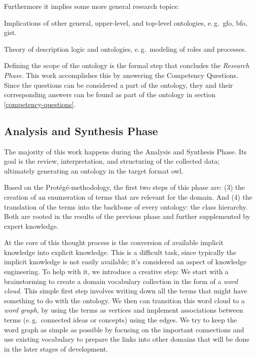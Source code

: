 \documentclass[a4paper, DIV=13, BCOR=0cm]{scrbook}
\newcommand{\eg}{e.\,g.\ }
\begin{document}
Furthermore it implies some more general research topics:
\begin{compactitem}
	\item Implications of other general, upper-level, and top-level ontologies, \eg \gls{gfo}, \gls{bfo}, \gls{gist}.
	\item Theory of description logic and ontologies, \eg modeling of roles and processes.
\end{compactitem}

Defining the scope of the ontology is the formal step that concludes the \textit{Research Phase}. This work accomplishes this by answering the Competency Questions. Since the questions can be considered a part of the ontology, they and their corresponding answers can be found as part of the ontology in section \ref{competency-questions}.

\subsection{Analysis and Synthesis Phase}
\label{analysis}
The majority of this work happens during the Analysis and Synthesis Phase. Its goal is the review, interpretation, and structuring of the collected data; ultimately generating an ontology in the target format \gls{owl}.

Based on the Protégé-methodology, the first two steps of this phase are: (3) the creation of an enumeration of terms that are relevant for the domain. And (4) the translation of the terms into the backbone of every ontology: the class hierarchy. Both are rooted in the results of the previous phase and further supplemented by expert knowledge.

At the core of this thought process is the conversion of available implicit knowledge into explicit knowledge. This is a difficult task, since typically the implicit knowledge is not easily available; it's considered an aspect of knowledge engineering. \cite[p.\,30--31]{moore2011towards} To help with it, we introduce a creative step: We start with a brainstorming to create a domain vocabulary collection in the form of a \textit{word cloud}. This simple first step involves writing down all the terms that might have something to do with the ontology. We then can transition this word cloud to a \textit{word graph}, by using the terms as vertices and implement associations between terms (\eg connected ideas or concepts) using the edges. We try to keep the word graph as simple as possible by focusing on the important connections and use existing vocabulary to prepare the links into other domains that will be done in the later stages of development.
\end{document}
